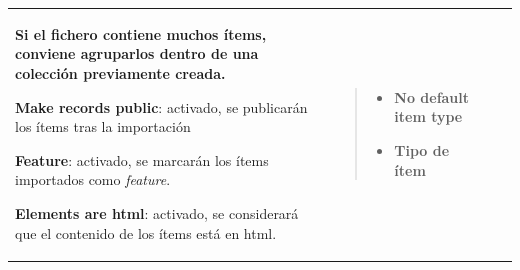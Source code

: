 \documentclass[
]{article}
\providecommand{\tightlist}{%
  \setlength{\itemsep}{0pt}\setlength{\parskip}{0pt}}
\begin{document}
\begin{longtable}[]{@{}llll@{}}
\begin{minipage}[t]{0.22\columnwidth}
\begin{description}
\textbf{Si el fichero contiene muchos ítems, conviene agruparlos dentro
de una colección previamente creada.}
\item[-\/-\/-\/-\/-\/-\/-\/-\/-\/-\/-\/-\/-\/-\/-\/-\/-\/-\/-\/-\/-\/-\/-\/-\/-\/-\/-\/-\/-\/-\/-\/-\/-\/-\/-\/-\/-\/-\/-\/-\/-\/-\/-\/-\/-\/-\/-\/-\/-\/-\/-\/-\/-\/-\/-\/-\/-\/-\/-\/-\/-\/-\/-\/-\/-\/-\/-\/-\/-\/-\/-\/-\/-\/-\/-\/-\/-\/-\/-\/-\/-\/-\/-\/-\/-\/-\/-\/-\/-\/-\/-\/-\/-\/-\/-\/-\/-\/-\/-\/-\/-\/-\/-\/-\/-\/-\/-\/-\/-\/-\/-\/-\/-\/-\/-\/-\/-\/-\/-\/-\/-\/-\/-\/-\/-\/-\/-\/-\/-\/-\/-\/-\/-\/-\/-\/-\/-\/-\/-\/-\/-\/-\/-\/-\/-\/-\/-\/-\/-\/-\/-\/-\/-\/-\/-\/-\/-\/-\/-\/-\/-\/-\/-\/-\/-\/-\/-\/-\/-\/-\/-\/-\/-\/-+]
\textbf{Make records public}: activado, se publicarán los ítems tras la
importación
\item[-\/-\/-\/-\/-\/-\/-\/-\/-\/-\/-\/-\/-\/-\/-\/-\/-\/-\/-\/-\/-\/-\/-\/-\/-\/-\/-\/-\/-\/-\/-\/-\/-\/-\/-\/-\/-\/-\/-\/-\/-\/-\/-\/-\/-\/-\/-\/-\/-\/-\/-\/-\/-\/-\/-\/-\/-\/-\/-\/-\/-\/-\/-\/-\/-\/-\/-\/-\/-\/-\/-\/-\/-\/-\/-\/-\/-\/-\/-\/-\/-\/-\/-\/-\/-\/-\/-\/-\/-\/-\/-\/-\/-\/-\/-\/-\/-\/-\/-\/-\/-\/-\/-\/-\/-\/-\/-\/-\/-\/-\/-\/-\/-\/-\/-\/-\/-\/-\/-\/-\/-\/-\/-\/-\/-\/-\/-\/-\/-\/-\/-\/-\/-\/-\/-\/-\/-\/-\/-\/-\/-\/-\/-\/-\/-\/-\/-\/-\/-\/-\/-\/-\/-\/-\/-\/-\/-\/-\/-\/-\/-\/-\/-\/-\/-\/-\/-\/-\/-\/-\/-\/-\/-\/-+]
\textbf{Feature}: activado, se marcarán los ítems importados como
\emph{feature}.
\item[-\/-\/-\/-\/-\/-\/-\/-\/-\/-\/-\/-\/-\/-\/-\/-\/-\/-\/-\/-\/-\/-\/-\/-\/-\/-\/-\/-\/-\/-\/-\/-\/-\/-\/-\/-\/-\/-\/-\/-\/-\/-\/-\/-\/-\/-\/-\/-\/-\/-\/-\/-\/-\/-\/-\/-\/-\/-\/-\/-\/-\/-\/-\/-\/-\/-\/-\/-\/-\/-\/-\/-\/-\/-\/-\/-\/-\/-\/-\/-\/-\/-\/-\/-\/-\/-\/-\/-\/-\/-\/-\/-\/-\/-\/-\/-\/-\/-\/-\/-\/-\/-\/-\/-\/-\/-\/-\/-\/-\/-\/-\/-\/-\/-\/-\/-\/-\/-\/-\/-\/-\/-\/-\/-\/-\/-\/-\/-\/-\/-\/-\/-\/-\/-\/-\/-\/-\/-\/-\/-\/-\/-\/-\/-\/-\/-\/-\/-\/-\/-\/-\/-\/-\/-\/-\/-\/-\/-\/-\/-\/-\/-\/-\/-\/-\/-\/-\/-\/-\/-\/-\/-\/-\/-+]
\textbf{Elements are html}: activado, se considerará que el contenido de
los ítems está en html.
\end{description}\strut
\end{minipage} & \begin{minipage}[t]{0.22\columnwidth}\raggedright
\begin{quote}
\begin{itemize}
\tightlist
\item
  \textbf{No default item type}
\item
  \textbf{Tipo de ítem}
\end{itemize}
\end{quote}


\end{minipage}
\end{longtable}
\end{document}
